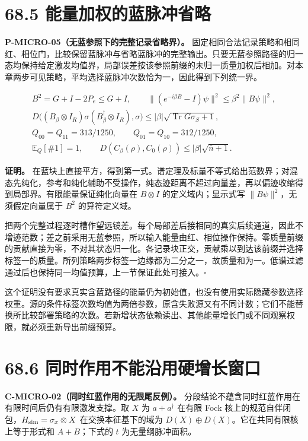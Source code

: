 \documentclass[
  11pt,
  oneside]{book}
\begin{document}
\section{68.5 能量加权的蓝脉冲省略}

\protect\hypertarget{p-micro-05}{}{}

\textbf{P-MICRO-05（无蓝参照下的完整记录省略界）。}
固定相同合法记录策略和相同红、相位门，比较保留蓝脉冲与省略蓝脉冲的完整输出。只要无蓝参照路径的归一态均保持给定激发均值界，局部误差按该参照前缀的未归一质量加权后相加。对本章两步可见策略，平均选择蓝脉冲次数恰为一，因此得到下列统一界。

\[
\begin{gathered}
B^2=G+I-2P_e\le G+I,\qquad
\|(e^{-i\beta B}-I)\psi\|^2\le\beta^2\|B\psi\|^2,\\
D\bigl((B_\beta\otimes I_R)\sigma(B_\beta^\dagger\otimes I_R),\sigma\bigr)
\le|\beta|\sqrt{\operatorname{Tr}G\sigma_S+1},\\
Q_{00}=Q_{11}=313/1250,\qquad Q_{01}=Q_{10}=312/1250,\\
\mathbb E_Q[\#1]=1,\qquad
D(C_\beta(\rho),C_0(\rho))\le|\beta|\sqrt{\bar n+1}.
\end{gathered}
\]

\textbf{证明。}
在蓝块上直接平方，得到第一式。谱定理及标量不等式给出范数界；对混态先纯化，参考和纯化辅助不受操作，纯态迹距离不超过向量差，再以偏迹收缩得到局部界。有限能量保证纯化向量在
\(B\otimes I\) 的定义域内；显示式写 \(\|B\psi\|^2\)，无须假定向量属于
\(B^2\) 的算符定义域。

把两个完整过程逐时槽作望远镜差。每个局部差后接相同的真实后续通道，因此不增迹范数；差之前采用无蓝参照，所以输入能量由红、相位操作保持。零质量前缀的贡献直接为零，不对其状态归一化。各记录块正交，贡献乘以到达该前缀并选择标签一的质量。所列策略两步标签一边缘都为二分之一，故质量和为一。低谱过滤通过后也保持同一均值预算，上一节保证此处可接入。\(\square\)

这个证明没有要求真实含蓝路径的能量仍为初始值，也没有使用实际隐藏参数选择权重。源的条件标签次数均值为两倍参数，原含失败源又有不同计数；它们不能替换所比较部署策略的次数。若新增状态依赖读出、其他能量增长门或不同观察权限，就必须重新导出前缀预算。

\section{68.6 同时作用不能沿用硬增长窗口}

\protect\hypertarget{c-micro-02}{}{}

\textbf{C-MICRO-02（同时红蓝作用的无限尾反例）。}
分段结论不蕴含同时红蓝作用在有限时间后仍有有限激发支撑。取 \(X\) 为
\(a+a^\dagger\) 在有限 Fock
核上的规范自伴闭包，\(H_{\rm sim}=\sigma_x\otimes X\)
在交换本征基下的域为 \(D(X)\oplus D(X)\)。它在共同有限核上等于形式和
\(A+B\)；下式的 \(t\) 为无量纲脉冲面积。
\end{document}

